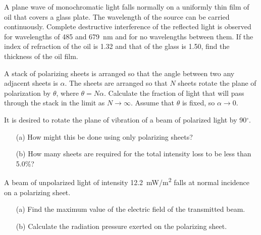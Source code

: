 \documentclass[12pt,letterpaper,boxed,cm]{hmcpset}
\begin{document}

\begin{problem}[41-P7*]
	A plane wave of monochromatic light falls normally on a uniformly thin film of oil that covers a glass plate. The wavelength of the source can be carried continuously. Complete destructive interference of the reflected light is observed for wavelengths of \SI{485}{} and \SI{679}{nm} and for no wavelengths between them. If the index of refraction of the oil is \SI{1.32}{} and that of the glass is \SI{1.50}{}, find the thickness of the oil film.
\end{problem}
\begin{solution}
\end{solution}
\newpage

\begin{problem}[44-P3]
	A stack of polarizing sheets is arranged so that the angle between two any adjacent sheets is $\alpha$. The sheets are arranged so that $N$ sheets rotate the plane of polarization by $\theta$, where $\theta = N\alpha$. Calculate the fraction of light that will pass through the stack in the limit as $N \rightarrow \infty$. Assume that $\theta$ is fixed, so $\alpha \rightarrow 0$.
\end{problem}
\begin{solution}
\end{solution}
\newpage

\begin{problem}[44-P4]
	It is desired to rotate the plane of vibration of a beam of polarized light by 90$^\circ$.
	\begin{enumerate}
		\item[(a)] How might this be done using only polarizing sheets?
		\item[(b)] How many sheets are required for the total intensity loss to be less than 5.0\%?
 \end{enumerate}
\end{problem}
\begin{solution}
\end{solution}
\newpage
 
\begin{problem}[44-E3]
	A beam of unpolarized light of intensity \SI{12.2}{mW/m^2} falls at normal incidence on a polarizing sheet. 
	\begin{enumerate}
		\item[(a)] Find the maximum value of the electric field of the transmitted beam.
		\item[(b)] Calculate the radiation pressure exerted on the polarizing sheet.
	\end{enumerate}
\end{problem}
\begin{solution}
\end{solution}
\end{document}
